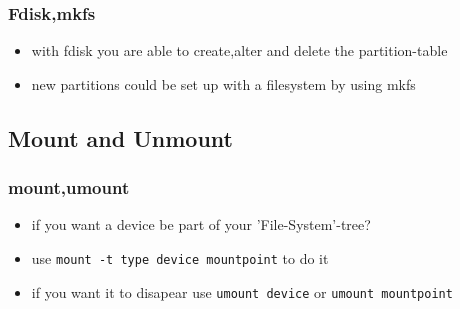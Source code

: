 \documentclass[draft,handout]{beamer}
\newcommand{\code}[1]{\colorbox{lGray}{\texttt{#1}}}
\begin{document}
    	\begin{frame}
			\frametitle{Fdisk,mkfs}
			\begin{itemize}
                \item<1-> with fdisk you are able to create,alter and delete the partition-table
                \item<1-> new partitions could be set up with a filesystem by using mkfs
            \end{itemize}
		\end{frame}
    \subsection{Mount and Unmount}
	    \begin{frame}
			\frametitle{mount,umount}
			\begin{itemize}
                \item<1-> if you want a device be part of your 'File-System'-tree?
                \item<1-> use \code{mount -t type device mountpoint} to do it
                \item<2-> if you want it to disapear use \code{umount device} or \code{umount mountpoint}
            \end{itemize}
		\end{frame}
\end{document}
